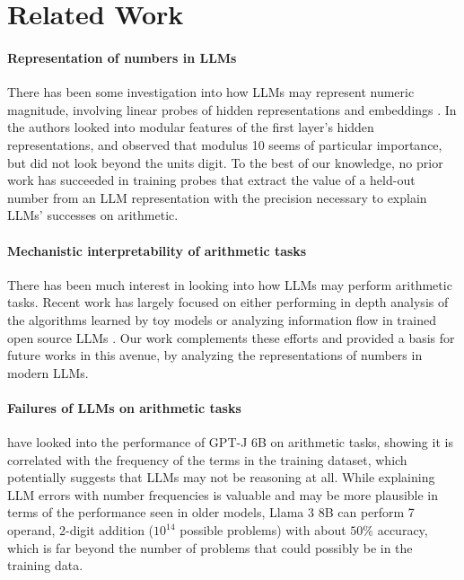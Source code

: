 \documentclass[11pt]{article}
\begin{document}
\section{Related Work}
\label{apx:related_work}

\paragraph{Representation of numbers in LLMs} There has been some investigation into how LLMs may represent numeric magnitude, involving linear probes of hidden representations \citep{zhu2024languagemodelsknowvalue,heinzerling-inui-2024-monotonic} and embeddings \citep{wallace2019nlpmodelsknownumbers}. In \citet{gould2023successorheadsrecurringinterpretable} the authors looked into modular features of the first layer's hidden representations, and observed that modulus 10 seems of particular importance, but did not look beyond the units digit. To the best of our knowledge, no prior work has succeeded in training probes that extract the value of a held-out number from an LLM representation with the precision necessary to explain LLMs' successes on arithmetic.

\paragraph{Mechanistic interpretability of arithmetic tasks} There has been much interest in looking into how LLMs may perform arithmetic tasks. Recent work has largely focused on either performing in depth analysis of the algorithms learned by toy models \citep{Maltoni_2024, nanda2023progressmeasuresgrokkingmechanistic, quirke2024understandingadditiontransformers, yehudai2024can} or analyzing information flow in trained open source LLMs \citep{stolfo2023mechanisticinterpretationarithmeticreasoning, chen2024stateshiddenhiddenstates}.
Our work complements these efforts and provided a basis for future works in this avenue, by analyzing the representations of numbers in modern LLMs.


\paragraph{Failures of LLMs on arithmetic tasks}
\citet{razeghi-etal-2022-impact} have looked into the performance of GPT-J 6B on arithmetic tasks, showing it is correlated with the frequency of the terms in the training dataset, which potentially suggests that LLMs may not be reasoning at all.
While explaining LLM errors with number frequencies is valuable and may be more plausible in terms of the performance seen in older models, Llama 3 8B can perform 7 operand, 2-digit addition ($10^{14}$ possible problems) with about $50\%$ accuracy, which is far beyond the number of problems that could possibly be in the training data.
\end{document}
